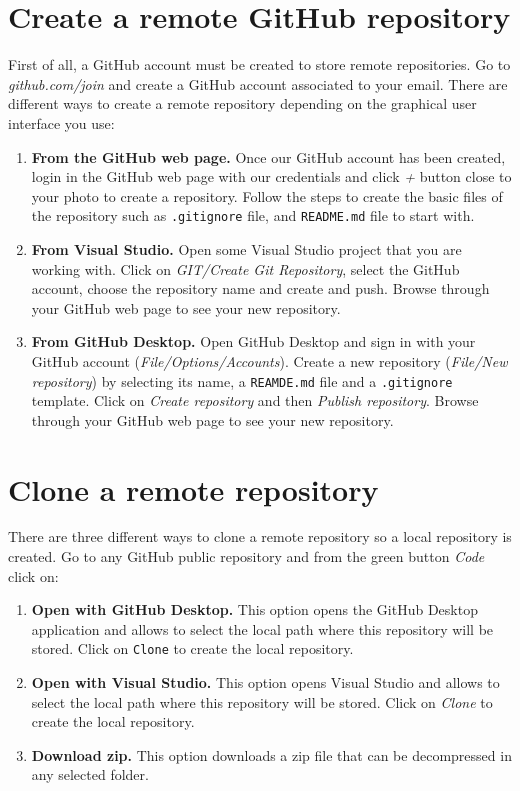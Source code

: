  
\section{Create a remote  GitHub repository}
 
 First of all, a GitHub account must be created to store remote repositories. 
 Go to \textit{github.com/join} and create a GitHub account associated to your email.
 There are different ways to create a remote repository depending on the graphical user 
 interface you use: 
   
 \begin{enumerate}
 \item {\bf From the GitHub web page.} Once our GitHub account has been created, login in the GitHub web page 
 with our credentials and click \textit{+} button close to your photo to create a repository. 
 Follow the steps to create the basic files of the repository such as \texttt{.gitignore} file,  
 and \texttt{README.md} file to start with. 
   
 \item {\bf From Visual Studio. } 
 Open some Visual Studio project that you are working with. 
Click on \textit{GIT/Create Git Repository}, 
 select the GitHub account, choose the repository name and create and push.
Browse through your  GitHub web page to see your new repository. 
 
 \item {\bf From GitHub Desktop. }
  Open GitHub Desktop and sign in with your GitHub account 
  (\textit{File/Options/Accounts}).  
  Create a new repository (\textit{File/New repository}) by selecting its name, 
  a \texttt{REAMDE.md} file and a \texttt{.gitignore} template. 
  Click on \textit{Create repository} and then \textit{Publish repository}.
  Browse through your GitHub web page to see your new repository.
  \end{enumerate} 



\section{Clone a remote repository}

There are three different ways to clone a remote repository 
so a local repository is created. 
Go to any GitHub public repository and from the green button  \textit{Code}
click on: 
 \begin{enumerate}
 \item {\bf  Open with GitHub Desktop.}
 This option opens the GitHub Desktop application and allows to select the  
 local path where this repository will be stored. 
  Click on \texttt{Clone} to create the local repository. 
 \item {\bf  Open with Visual Studio. } 
 This option opens Visual Studio and allows to select the local path where this repository 
  will be stored. Click on \textit{Clone} to create the local repository. 
 \item {\bf Download zip. } 
 This option downloads a zip file that can be decompressed in any selected folder.
  
\end{enumerate} 



